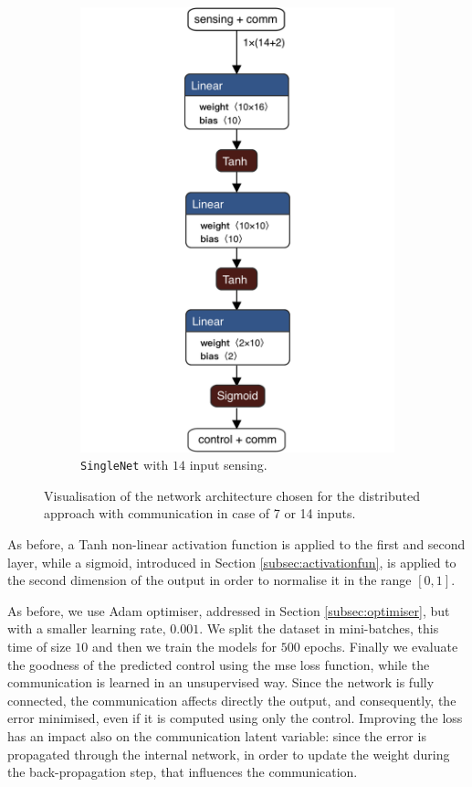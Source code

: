 \begin{figure}[!htb]
\begin{subfigure}[h]{0.495\textwidth}
		\includegraphics[width=.8\textwidth]{contents/images/task1distributed_allcomm@4x}
		\caption{\texttt{SingleNet} with $14$ input sensing.}
	\end{subfigure}
	\caption[Network architectures for the distributed approach with 
	communication.]{Visualisation of the network architecture chosen for the 
		distributed approach with communication in case of 7 or 14 inputs.}
	\label{fig:singlenetcomm1}
\end{figure}

As before, a Tanh non-linear activation function is applied to the first and second 
layer, while a sigmoid, introduced in Section \ref{subsec:activationfun}, is applied 
to the second dimension of the output in order to normalise it in the range $[0, 
1]$.

As before, we use Adam optimiser, addressed in Section \ref{subsec:optimiser}, 
but with a smaller learning rate, $0.001$. 
We split the dataset in mini-batches, this time of size $10$ and then we train 
the models for $500$ epochs. 
Finally we evaluate the goodness of the predicted control using the \gls{mse} 
loss function, while the communication is learned in an unsupervised way.
Since the network is fully connected, the communication affects directly the 
output, and consequently, the error minimised, even if it is computed using 
only the control. Improving the loss has an impact also on the 
communication latent variable: since the error is propagated through the 
internal network, in order to update the weight during the back-propagation 
step, that influences the communication.

